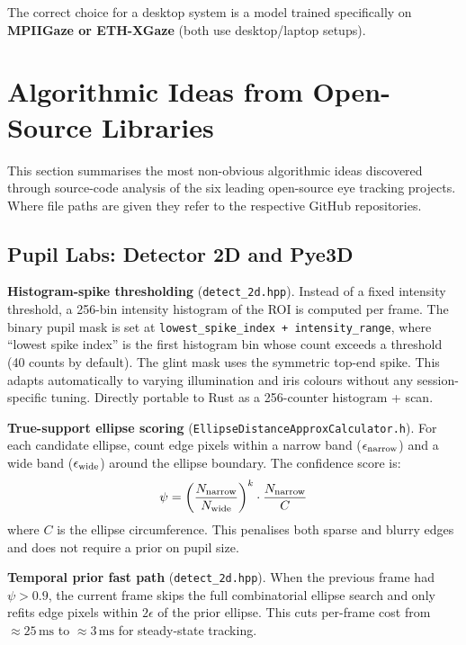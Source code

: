 \documentclass[11pt,a4paper]{article}
\begin{document}
The correct choice for a desktop system is a model trained specifically on \textbf{MPIIGaze or ETH-XGaze} (both use desktop/laptop setups).

\section{Algorithmic Ideas from Open-Source Libraries}
\label{sec:oss_ideas}

This section summarises the most non-obvious algorithmic ideas discovered through
source-code analysis of the six leading open-source eye tracking projects.
Where file paths are given they refer to the respective GitHub repositories.

\subsection{Pupil Labs: Detector 2D and Pye3D}

\textbf{Histogram-spike thresholding} (\texttt{detect\_2d.hpp}).
Instead of a fixed intensity threshold, a 256-bin intensity histogram of the ROI is computed
per frame.
The binary pupil mask is set at \texttt{lowest\_spike\_index + intensity\_range}, where
``lowest spike index'' is the first histogram bin whose count exceeds a threshold (40 counts
by default).
The glint mask uses the symmetric top-end spike.
This adapts automatically to varying illumination and iris colours
without any session-specific tuning.
Directly portable to Rust as a 256-counter histogram + scan.

\textbf{True-support ellipse scoring} (\texttt{EllipseDistanceApproxCalculator.h}).
For each candidate ellipse, count edge pixels within a narrow band
($\epsilon_{\rm narrow}$) and a wide band ($\epsilon_{\rm wide}$) around the ellipse boundary.
The confidence score is:
\[
  \psi = \left(\frac{N_{\rm narrow}}{N_{\rm wide}}\right)^k \cdot \frac{N_{\rm narrow}}{C}
\]
where $C$ is the ellipse circumference.
This penalises both sparse and blurry edges and does not require a prior on pupil size.

\textbf{Temporal prior fast path} (\texttt{detect\_2d.hpp}).
When the previous frame had $\psi > 0.9$, the current frame skips
the full combinatorial ellipse search and only refits edge pixels
within $2\epsilon$ of the prior ellipse.
This cuts per-frame cost from $\approx25\,\text{ms}$ to $\approx3\,\text{ms}$
for steady-state tracking.
\end{document}

